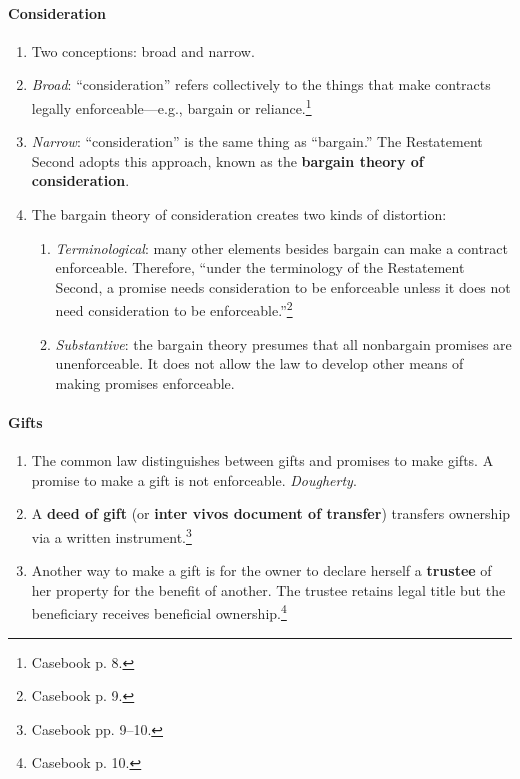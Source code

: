 \paragraph{Consideration}

\begin{enumerate}
    \item Two conceptions: broad and narrow.
    \item \emph{Broad}: ``consideration'' refers collectively to the things 
    that make contracts legally enforceable---e.g., bargain or 
    reliance.\footnote{Casebook p. 8.}
    \item \emph{Narrow}: ``consideration'' is the same thing as ``bargain.'' 
    The Restatement Second adopts this approach, known as the \textbf{bargain 
    theory of consideration}.
    \item The bargain theory of consideration creates two kinds of distortion:
    \begin{enumerate}
        \item \emph{Terminological}: many other elements besides bargain can 
        make a contract enforceable. Therefore, ``under the terminology of the 
        Restatement Second, a promise needs consideration to be enforceable 
        unless it does not need consideration to be 
        enforceable.''\footnote{Casebook p. 9.}
        \item \emph{Substantive}: the bargain theory presumes that all 
        nonbargain promises are unenforceable. It does not allow the law to 
        develop other means of making promises enforceable.
    \end{enumerate}
\end{enumerate}

\paragraph{Gifts}

\begin{enumerate}
    \item The common law distinguishes between gifts and promises to make 
    gifts. A promise to make a gift is not enforceable. \emph{Dougherty}.
    \item A \textbf{deed of gift} (or \textbf{inter vivos document of 
    transfer}) transfers ownership via a written instrument.\footnote{Casebook 
    pp. 9--10.}
    \item Another way to make a gift is for the owner to declare herself a 
    \textbf{trustee} of her property for the benefit of another. The trustee 
    retains legal title but the beneficiary receives beneficial 
    ownership.\footnote{Casebook p. 10.}
\end{enumerate}

